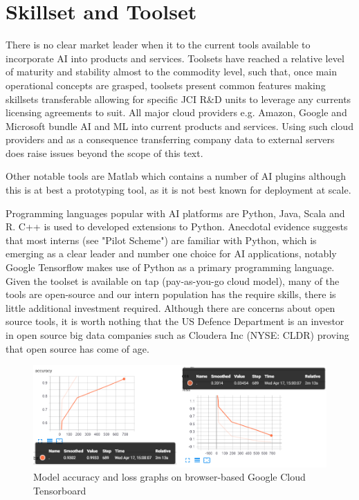 \section{Skillset and Toolset}

There is no clear market leader when it to the current tools available to incorporate AI into products and services.   
Toolsets have reached a relative level of maturity and stability almost to the commodity level, such that, once main operational concepts are grasped, toolsets present common features \cite{Landset2015} making skillsets transferable allowing for specific JCI R\&D units to leverage any currents licensing agreements to suit. All major cloud providers e.g. Amazon, Google and Microsoft bundle AI and ML into current products and services.  
Using such cloud providers and as a consequence transferring company data to external servers does raise issues beyond the scope of this text.  

Other notable tools are Matlab which contains a number of AI plugins although this is at best a prototyping tool, as it is not best known for deployment at scale.  

Programming languages popular with AI platforms are Python, Java, Scala and R. C++ is used to developed extensions to Python. Anecdotal evidence suggests that most interns (see "Pilot Scheme") are familiar with Python, which is emerging as a clear leader and number one choice for AI applications, notably Google Tensorflow makes use of Python as a primary programming language. Given the toolset is available on tap (pay-as-you-go cloud model), many of the tools are open-source and our intern population has the require skills, there is little additional investment required. Although there are concerns about open source tools, it is worth nothing that the US Defence Department is an investor in open source big data companies \cite{Defense2016} such as Cloudera Inc (NYSE: CLDR) proving that open source has come of age.

\begin{figure}[ht]
 \centering %
 \includegraphics[width=140mm]{images/flowersdropout.png}
 \caption{Model accuracy and loss graphs on browser-based Google Cloud Tensorboard}
 \label{fig:sample}
\end{figure}

